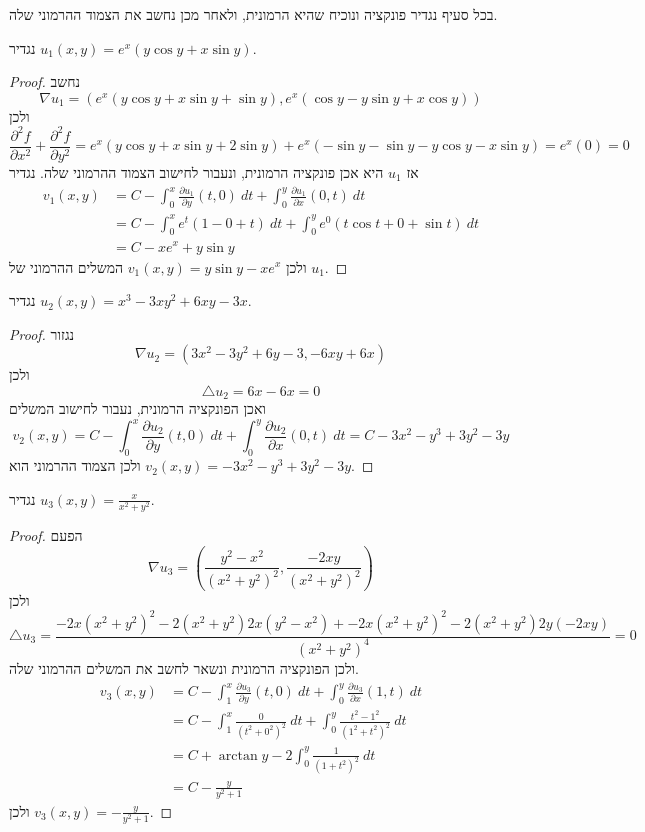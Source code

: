 \Question{}
בכל סעיף נגדיר פונקציה ונוכיח שהיא הרמונית, ולאחר מכן נחשב את הצמוד ההרמוני שלה.

\Subquestion{}
נגדיר $u_1(x, y) = e^x (y \cos y + x \sin y)$.
\begin{proof}
	נחשב
	\[
		\nabla u_1 = (e^x (y \cos y + x \sin y + \sin y), e^x(\cos y - y \sin y + x \cos y))
	\]
	ולכן
	\[
		\frac{\partial^2 f}{\partial x^2} + \frac{\partial^2 f}{\partial y^2}
		= e^x (y \cos y + x \sin y + 2 \sin y) + e^x (-\sin y - \sin y - y \cos y - x \sin y)
		= e^x (0)
		= 0
	\]
	אז $u_1$ היא אכן פונקציה הרמונית, ונעבור לחישוב הצמוד ההרמוני שלה.
	נגדיר
	\begin{align*}
		v_1(x, y)
		& = C - \int_{0}^{x} \frac{\partial u_1}{\partial y}(t, 0)\ dt + \int_{0}^{y} \frac{\partial u_1}{\partial x}(0, t)\ dt \\
		& = C - \int_{0}^{x} e^t (1 - 0 + t)\ dt + \int_{0}^{y} e^0 (t \cos t + 0 + \sin t)\ dt \\
		& = C - x e^x + y \sin y
	\end{align*}
	ולכן $v_1(x, y) = y \sin y - x e^x$ המשלים ההרמוני של $u_1$.
\end{proof}

\Subquestion{}
נגדיר $u_2(x, y) = x^3 - 3 x y^2 + 6x y - 3x$.
\begin{proof}
	נגזור
	\[
		\nabla u_2 = (3x^2 - 3y^2 + 6y - 3, -6x y + 6x)
	\]
	ולכן
	\[
		\triangle u_2 = 6x - 6x = 0
	\]
	ואכן הפונקציה הרמונית, נעבור לחישוב המשלים
	\[
		v_2(x, y)
		= C - \int_{0}^{x} \frac{\partial u_2}{\partial y}(t, 0)\ dt + \int_{0}^{y} \frac{\partial u_2}{\partial x}(0, t)\ dt
		= C - 3x^2 - y^3 + 3y^2 - 3y
	\]
	ולכן הצמוד ההרמוני הוא $v_2(x, y) = -3x^2 - y^3 + 3y^2 - 3y$.
\end{proof}

\Subquestion{}
נגדיר $u_3(x, y) = \frac{x}{x^2 + y^2}$.
\begin{proof}
	הפעם
	\[
		\nabla u_3 = (\frac{y^2 - x^2}{{(x^2 + y^2)}^2}, \frac{-2xy}{{(x^2 + y^2)}^2})
	\]
	ולכן
	\[
		\triangle u_3 = \frac{-2x {(x^2 + y^2)}^2 - 2 (x^2 + y^2) 2x (y^2 - x^2) + -2x {(x^2 + y^2)}^2 - 2 (x^2 + y^2) 2y (-2xy)}{{(x^2 + y^2)}^4} = 0
	\]
	ולכן הפונקציה הרמונית ונשאר לחשב את המשלים ההרמוני שלה.
	\begin{align*}
		v_3(x, y)
		& = C - \int_{1}^{x} \frac{\partial u_3}{\partial y}(t, 0)\ dt + \int_{0}^{y} \frac{\partial u_3}{\partial x}(1, t)\ dt \\
		& = C - \int_{1}^{x} \frac{0}{{(t^2 + 0^2)}^2}\ dt + \int_{0}^{y} \frac{t^2 - 1^2}{{(1^2 + t^2)}^2}\ dt \\
		& = C + \arctan y - 2 \int_{0}^{y} \frac{1}{{(1 + t^2)}^2}\ dt \\
		& = C - \frac{y}{y^2 + 1}
	\end{align*}
	ולכן $v_3(x, y) = - \frac{y}{y^2 + 1}$.
\end{proof}

